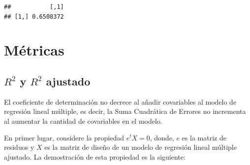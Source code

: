 \documentclass[
  11pt,
]{book}
\newenvironment{Shaded}{\begin{snugshade}}{\end{snugshade}}
\newcommand{\AttributeTok}[1]{\textcolor[rgb]{0.13,0.29,0.53}{#1}}
\newcommand{\CommentTok}[1]{\textcolor[rgb]{0.56,0.35,0.01}{\textit{#1}}}
\newcommand{\DecValTok}[1]{\textcolor[rgb]{0.00,0.00,0.81}{#1}}
\newcommand{\FunctionTok}[1]{\textcolor[rgb]{0.13,0.29,0.53}{\textbf{#1}}}
\newcommand{\NormalTok}[1]{#1}
\newcommand{\OtherTok}[1]{\textcolor[rgb]{0.56,0.35,0.01}{#1}}
\newcommand{\SpecialCharTok}[1]{\textcolor[rgb]{0.81,0.36,0.00}{\textbf{#1}}}
\theoremstyle{definition}
\theoremstyle{definition}
\theoremstyle{definition}
\theoremstyle{definition}
\theoremstyle{remark}
\begin{document}
\begin{Shaded}
\end{Shaded}

\begin{verbatim}
##           [,1]
## [1,] 0.6508372
\end{verbatim}

\chapter{Métricas}\label{muxe9tricas}

\section{\texorpdfstring{\(R^2\) y \(R^2\) ajustado}{R\^{}2 y R\^{}2 ajustado}}\label{R2-no-decreciente}

El coeficiente de determinación no decrece al añadir covariables al modelo de regresión lineal múltiple, es decir, la Suma Cuadrática de Errores no incrementa al aumentar la cantidad de covariables en el modelo.

En primer lugar, considere la propiedad \(e^tX = 0\), donde, \(e\) es la matriz de residuos y \(X\) es la matriz de diseño de un modelo de regresión lineal múltiple ajustado. La demostración de esta propiedad es la siguiente:
\end{document}
